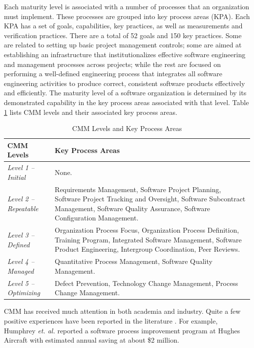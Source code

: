 Each maturity level is associated with a number of processes that an organization must implement. These processes are grouped into key process areas (KPA). Each KPA has a set of goals, capabilities, key practices, as well as measurements and verification practices. There are a total of 52 goals and 150 key practices. Some are related to setting up basic project management controls; some are aimed at establishing an infrastructure that institutionalizes effective software engineering and management processes across projects; while the rest are focused on performing a well-defined engineering process that integrates all software engineering activities to produce correct, consistent software products effectively and efficiently. The maturity level of a software organization is determined by its demonstrated capability in the key process areas associated with that level. Table \ref{table:CMM-KPA} lists CMM levels and their associated key process areas.

\begin{table}[tbp]
	\centering
		\caption{CMM Levels and Key Process Areas}
		\begin{tabular}{|p{}|p{}|} 
		  \hline
			\textbf{CMM Levels} & \textbf{Key Process Areas} \\
			\hline 
			\textit{Level 1 -- Initial} & None. \\
			\hline
			\textit{Level 2 -- Repeatable} & Requirements Management, Software Project Planning, Software Project Tracking and Oversight, Software Subcontract Management, Software Quality Assurance, Software Configuration Management. \\
			\hline
			\textit{Level 3 -- Defined} &  Organization Process Focus, Organization Process Definition, Training Program, Integrated Software Management, Software Product
Engineering, Intergroup Coordination, Peer Reviews. \\
			\hline
			\textit{Level 4 -- Managed} & Quantitative Process Management, Software Quality Management. \\
			\hline
			\textit{Level 5 -- Optimizing} & Defect Prevention, Technology Change Management, Process Change Management. \\
			\hline
		\end{tabular}
	\label{table:CMM-KPA}
\end{table}

CMM has received much attention in both academia and industry. Quite a few positive experiences have been reported in the literature \cite{Humphrey:1991, Dion:1993, Daskalantonakis:1994, Diaz:1997}. For example, Humphrey \textit{et. al. }\cite{Humphrey:1991} reported a software process improvement program at Hughes Aircraft with estimated annual saving at about \$2 million.

